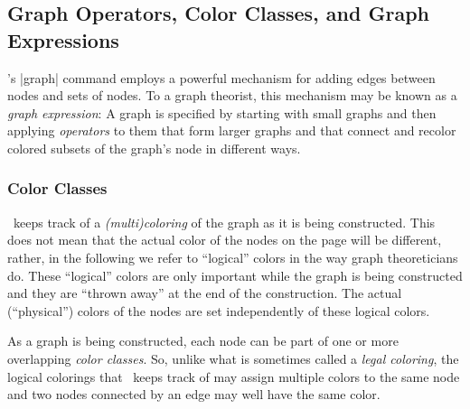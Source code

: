 \subsection{Graph Operators, Color Classes, and Graph Expressions}
\label{section-library-graphs-color-classes}

\tikzname's |graph| command employs a powerful mechanism for adding edges
between nodes and sets of nodes. To a graph theorist, this mechanism may be
known as a \emph{graph expression}: A graph is specified by starting with small
graphs and then applying \emph{operators} to them that form larger graphs and
that connect and recolor colored subsets of the graph's node in different ways.


\subsubsection{Color Classes}
\label{section-library-graph-coloring}

\tikzname\ keeps track of a \emph{(multi)coloring} of the graph as it is being
constructed. This does not mean that the actual color of the nodes on the page
will be different, rather, in the following we refer to ``logical'' colors in
the way graph theoreticians do. These ``logical'' colors are only important
while the graph is being constructed and they are ``thrown away'' at the end of
the construction. The actual (``physical'') colors of the nodes are set
independently of these logical colors.

As a graph is being constructed, each node can be part of one or more
overlapping \emph{color classes}. So, unlike what is sometimes called a
\emph{legal coloring}, the logical colorings that \tikzname\ keeps track of may
assign multiple colors to the same node and two nodes connected by an edge may
well have the same color.

